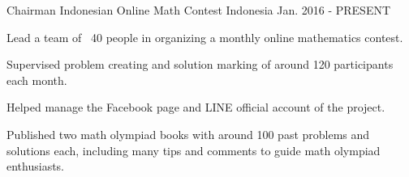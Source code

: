 

\begin{cventries}


	\cventry
	{Chairman} %
	{Indonesian Online Math Contest} %
	{Indonesia} %
	{Jan. 2016 - PRESENT} %
	{ %
		\begin{cvitems}
		\item {Lead a team of ~40 people in organizing a monthly online mathematics contest.}
		\item {Supervised problem creating and solution marking of around 120 participants each month.}
		\item {Helped manage the Facebook page and LINE official account of the project.}
		\item {Published two math olympiad books with around 100 past problems and solutions each, including many tips and comments to guide math olympiad enthusiasts.}
		\end{cvitems}
	}


\end{cventries}
